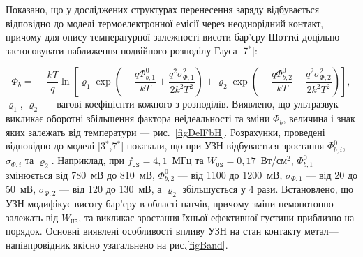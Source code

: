 Показано, що у досліджених структурах перенесення заряду відбувається відповідно до
моделі термоелектронної емісії через неоднорідний контакт,
причому для опису температурної залежності висоти бар'єру Шотткі доцільно
застосовувати наближення подвійного розподілу Гауса
[7$^*$]:

\begin{equation}
\label{eqDG}
  \Phi_{b}\!=\!-\frac{kT}{q}\ln\!\left[\varrho_1\exp\left(\!-\frac{q\Phi_{b,1}^0}{kT}+
  \frac{q^2\sigma^2_{\Phi,1}}{2k^2T^2}\right)
   +
  \varrho_2\exp\left(\!-\frac{q\Phi_{b,2}^{0}}{kT}+
  \frac{q^2\sigma^2_{\Phi,2}}{2k^2T^2}\right)\right],
\end{equation}
$\varrho_1$, $\varrho_2$ --- вагові коефіцієнти кожного з розподілів.
Виявлено, що ультразвук викликає оборотні збільшення фактора неідеальності та зміни $\Phi_{b}$,
величина і знак яких залежать від температури --- рис.~\ref{figDelFbH}.
Розрахунки, проведені відповідно до моделі
[3$^*$,7$^*$] показали, що при УЗН відбувається зростання $\Phi_{b,i}^0$, $\sigma_{\Phi,i}$ та $\varrho_2$.
Наприклад, при $f_\mathtt{US}=4,1$~МГц та $W_\mathtt{US}=0,17$~Вт/см$^2$,
$\Phi_{b,1}^0$ змінюється від 780~мВ до 810~мВ, 
$\Phi_{b,2}^0$ --- від 1100 до  1200~мВ,
$\sigma_{\Phi,1}$ --- від 20 до  50~мВ,
$\sigma_{\Phi,2}$ --- від 120 до  130~мВ,
а $\varrho_2$ збільшується у 4 рази.
Встановлено, 
що УЗН модифікує висоту бар'єру в області патчів, причому зміни немонотонно залежать від $W_\mathtt{US}$,
та викликає зростання їхньої ефективної густини приблизно на порядок.
Основні виявлені особливості впливу УЗН на стан контакту метал---напівпровідник якісно узагальнено на рис.\ref{figBand}.



